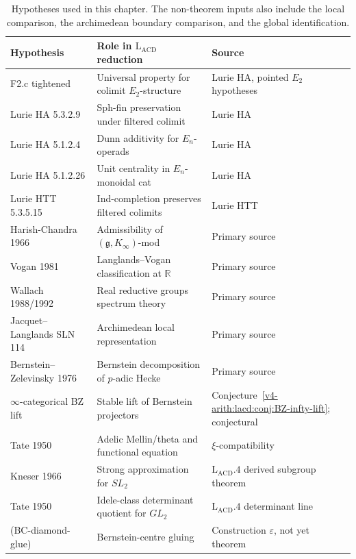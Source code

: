 \begin{table}[h]
\centering
\small
\begin{tabular}{@{}>{\raggedright\arraybackslash}p{}|>{\raggedright\arraybackslash}p{}|>{\raggedright\arraybackslash}p{}@{}}
Hypothesis & Role in \(\mathrm{L}_{\mathrm{ACD}}\) reduction & Source \\
\hline
F2.c tightened & Universal property for colimit \(E_{2}\)-structure & Lurie HA, pointed \(E_{2}\) hypotheses \\
Lurie HA 5.3.2.9 & Sph-fin preservation under filtered colimit & Lurie HA \\
Lurie HA 5.1.2.4 & Dunn additivity for \(E_{n}\)-operads & Lurie HA \\
Lurie HA 5.1.2.26 & Unit centrality in \(E_{n}\)-monoidal cat & Lurie HA \\
Lurie HTT 5.3.5.15 & Ind-completion preserves filtered colimits & Lurie HTT \\
Harish-Chandra 1966 & Admissibility of \((\mathfrak{g}, K_{\infty})\)-mod & Primary source \\
Vogan 1981 & Langlands--Vogan classification at \(\mathbb{R}\) & Primary source \\
Wallach 1988/1992 & Real reductive groups spectrum theory & Primary source \\
Jacquet--Langlands SLN 114 & Archimedean local representation & Primary source \\
Bernstein--Zelevinsky 1976 & Bernstein decomposition of \(p\)-adic Hecke & Primary source \\
\(\infty\)-categorical BZ lift & Stable lift of Bernstein projectors & Conjecture~\ref{v4-arith:lacd:conj:BZ-infty-lift}; conjectural \\
Tate 1950 & Adelic Mellin/theta and functional equation & \(\xi\)-compatibility \\
Kneser 1966 & Strong approximation for \(SL_{2}\) & \(\mathrm{L}_{\mathrm{ACD}}.4\) derived subgroup theorem \\
Tate 1950 & Idele-class determinant quotient for \(GL_{2}\) & \(\mathrm{L}_{\mathrm{ACD}}.4\) determinant line \\
(BC-diamond-glue) & Bernstein-centre gluing & Construction \(\varepsilon\), not yet theorem \\
\end{tabular}
\caption{Hypotheses used in this chapter. The non-theorem inputs also
include the local comparison, the archimedean boundary comparison, and
the global identification.}
\label{v4-arith:lacd:tbl:hypotheses}
\end{table}

